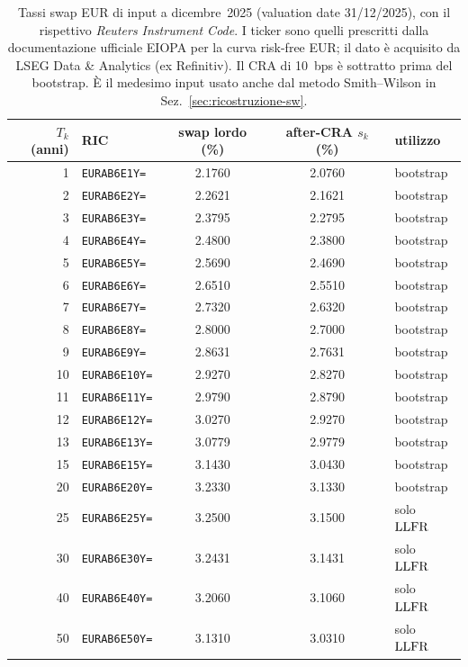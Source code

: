 \begin{table}[H]\centering\small
\caption{Tassi swap EUR di input a dicembre~2025 (valuation date 31/12/2025), con il rispettivo \emph{Reuters Instrument Code}. I ticker sono quelli prescritti dalla documentazione ufficiale EIOPA per la curva risk-free EUR; il dato \`e acquisito da LSEG Data \& Analytics (ex Refinitiv). Il CRA di 10~bps \`e sottratto prima del bootstrap. \`E il medesimo input usato anche dal metodo Smith--Wilson in Sez.~\ref{sec:ricostruzione-sw}.}
\label{tab:input-ric-dic}\renewcommand{\arraystretch}{1.15}
\begin{tabular}{rlccl}
\toprule
$T_k$ (anni) & RIC & swap lordo (\%) & after-CRA $s_k$ (\%) & utilizzo\\
\midrule
\rowcolor{rowtint}1 & \texttt{EURAB6E1Y=} & 2.1760 & 2.0760 & bootstrap\\
2 & \texttt{EURAB6E2Y=} & 2.2621 & 2.1621 & bootstrap\\
\rowcolor{rowtint}3 & \texttt{EURAB6E3Y=} & 2.3795 & 2.2795 & bootstrap\\
4 & \texttt{EURAB6E4Y=} & 2.4800 & 2.3800 & bootstrap\\
\rowcolor{rowtint}5 & \texttt{EURAB6E5Y=} & 2.5690 & 2.4690 & bootstrap\\
6 & \texttt{EURAB6E6Y=} & 2.6510 & 2.5510 & bootstrap\\
\rowcolor{rowtint}7 & \texttt{EURAB6E7Y=} & 2.7320 & 2.6320 & bootstrap\\
8 & \texttt{EURAB6E8Y=} & 2.8000 & 2.7000 & bootstrap\\
\rowcolor{rowtint}9 & \texttt{EURAB6E9Y=} & 2.8631 & 2.7631 & bootstrap\\
10 & \texttt{EURAB6E10Y=} & 2.9270 & 2.8270 & bootstrap\\
\rowcolor{rowtint}11 & \texttt{EURAB6E11Y=} & 2.9790 & 2.8790 & bootstrap\\
12 & \texttt{EURAB6E12Y=} & 3.0270 & 2.9270 & bootstrap\\
\rowcolor{rowtint}13 & \texttt{EURAB6E13Y=} & 3.0779 & 2.9779 & bootstrap\\
15 & \texttt{EURAB6E15Y=} & 3.1430 & 3.0430 & bootstrap\\
\rowcolor{rowtint}20 & \texttt{EURAB6E20Y=} & 3.2330 & 3.1330 & bootstrap\\
25 & \texttt{EURAB6E25Y=} & 3.2500 & 3.1500 & solo $\mathrm{LLFR}$\\
\rowcolor{rowtint}30 & \texttt{EURAB6E30Y=} & 3.2431 & 3.1431 & solo $\mathrm{LLFR}$\\
40 & \texttt{EURAB6E40Y=} & 3.2060 & 3.1060 & solo $\mathrm{LLFR}$\\
\rowcolor{rowtint}50 & \texttt{EURAB6E50Y=} & 3.1310 & 3.0310 & solo $\mathrm{LLFR}$\\
\bottomrule
\end{tabular}
\end{table}
